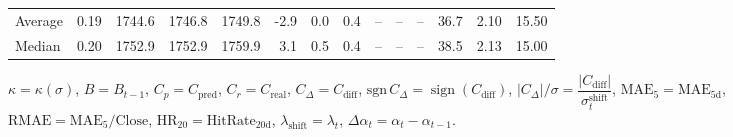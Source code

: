 \begin{threeparttable}
{\begin{tabular}{lrrrrrrrrrrrrr}
Average &     0.19 & 1744.6 & 1746.8 & 1749.8 &       -2.9 &                      0.0 &                 0.4 &         -- &        -- &             -- &             36.7 &            2.10 &                  15.50 \\
 Median &     0.20 & 1752.9 & 1752.9 & 1759.9 &        3.1 &                      0.5 &                 0.4 &         -- &        -- &             -- &             38.5 &            2.13 &                  15.00 \\
\bottomrule
\end{tabular}
}
\begin{tablenotes}\footnotesize
\item $\kappa=\kappa(\sigma)$, $B=B_{t-1}$, $C_p=C_{\text{pred}}$, $C_r=C_{\text{real}}$, $C_\Delta=C_{\text{diff}}$, $\mathrm{sgn}\,C_\Delta=\operatorname{sign}(C_{\text{diff}})$, $|C_\Delta|/\sigma=\dfrac{|C_{\text{diff}}|}{\sigma_t^{\text{shift}}}$, $\mathrm{MAE}_5=\mathrm{MAE}_{5\text{d}}$, $\mathrm{RMAE}= \mathrm{MAE}_5 / \text{Close}$, $\mathrm{HR}_{20}=\mathrm{HitRate}_{20\text{d}}$, 
$\lambda_{\text{shift}}=\lambda_t$, 
$\Delta\alpha_t=\alpha_t-\alpha_{t-1}$.
\end{tablenotes}
\end{threeparttable}
\endgroup

